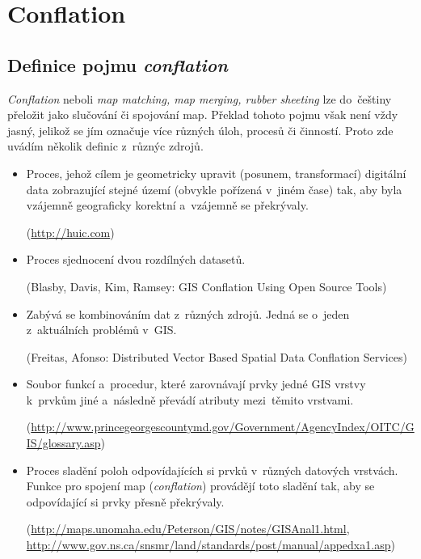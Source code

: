 \chapter{Conflation}
\label{2-conflation}

\section{Definice pojmu \textit{conflation}}
\label{definice}

\textit{Conflation} neboli \textit{map matching, map merging, rubber sheeting} 
lze do~češtiny přeložit jako slučování či spojování map. Překlad tohoto pojmu 
však není vždy jasný, jelikož se jím označuje více různých úloh, procesů či 
činností. Proto zde uvádím několik definic z~různýc zdrojů. 

\begin{itemize}
 \item Proces, jehož cílem je geometricky upravit (posunem, transformací) 
    digitální data zobrazující stejné území (obvykle pořízená v~jiném čase) 
    tak, aby byla vzájemně geograficky korektní a~vzájemně se překrývaly. %
    
    (\url{http://huic.com})

  \item Proces sjednocení dvou rozdílných datasetů.
    
    (Blasby, Davis, Kim, Ramsey: GIS Conflation Using Open Source Tools)

  \item Zabývá se kombinováním dat z~různých zdrojů. Jedná se o~jeden 
    z~aktuálních problémů v~GIS.
   
    (Freitas, Afonso: Distributed Vector Based Spatial Data Conflation 
    Services)

  \item Soubor funkcí a~procedur, které zarovnávají prvky jedné GIS vrstvy
    k~prvkům jiné a~následně převádí atributy mezi~těmito vrstvami.
   
    (\url{http://www.princegeorgescountymd.gov/Government/AgencyIndex/OITC/GIS/glossary.asp})

  \item Proces sladění poloh odpovídajících si prvků v~různých datových 
    vrstvách. Funkce pro spojení map (\textit{conflation}) provádějí toto 
    sladění tak, aby se odpovídající si prvky přesně překrývaly. 
    
    (\url{http://maps.unomaha.edu/Peterson/GIS/notes/GISAnal1.html},
    \newline \url{http://www.gov.ns.ca/snsmr/land/standards/post/manual/appedxa1.asp})


\end{itemize}
